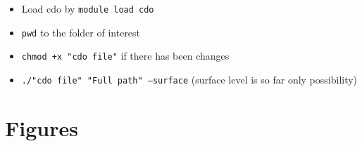 \begin{itemize}
    \item Load cdo by \texttt{module load cdo}
    \item \texttt{pwd} to the folder of interest
    \item \texttt{chmod +x "cdo file"} if there has been changes
    \item \texttt{./"cdo file" "Full path" --surface} (surface level is so far only possibility)
\end{itemize}

\cleardoublepage


\chapter{Figures}
\cleardoublepage
